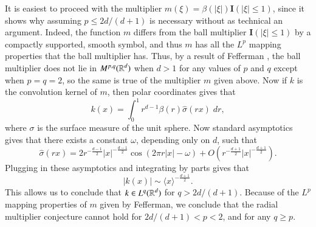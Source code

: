 It is easiest to proceed with the multiplier $m(\xi) = \beta(|\xi|) \mathbf{I}(|\xi| \leq 1)$, since it shows why assuming $p \leq 2d/(d+1)$ is necessary without as technical an argument. Indeed, the function $m$ differs from the ball multiplier $\mathbf{I}(|\xi| \leq 1)$ by a compactly supported, smooth symbol, and thus $m$ has all the $L^p$ mapping properties that the ball multiplier has. Thus, by a result of Fefferman \cite{Fefferman}, the ball multiplier does not lie in $M^{p,q}(\operatorname{\mathbb{R}}^d)$ when $d > 1$ for any values of $p$ and $q$ except when $p = q = 2$, so the same is true of the multiplier $m$ given above. Now if $k$ is the convolution kernel of $m$, then polar coordinates gives that
%
\[ k(x) = \int_0^1 r^{d-1} \beta(r) \widehat{\sigma}(r x)\; dr, \]
%
where $\sigma$ is the surface measure of the unit sphere. Now standard asymptotics gives that there exists a constant $\omega$, depending only on $d$, such that
%
\[ \widehat{\sigma}(rx) = 2 r^{- \frac{d-1}{2}} |x|^{- \frac{d-1}{2}} \cos(2 \pi r |x| - \omega) + O(r^{- \frac{d+1}{2}} |x|^{- \frac{d+1}{2}}). \]
%
Plugging in these asymptotics and integrating by parts gives that
%
\[ |k(x)| \sim \langle x \rangle^{- \frac{d+1}{2}}. \]
%
This allows us to conclude that $k \in L^q(\operatorname{\mathbb{R}}^d)$ for $q > 2d/(d+1)$. Because of the $L^p$ mapping properties of $m$ given by Fefferman, we conclude that the radial multiplier conjecture cannot hold for $2d/(d+1) < p < 2$, and for any $q \geq p$.

